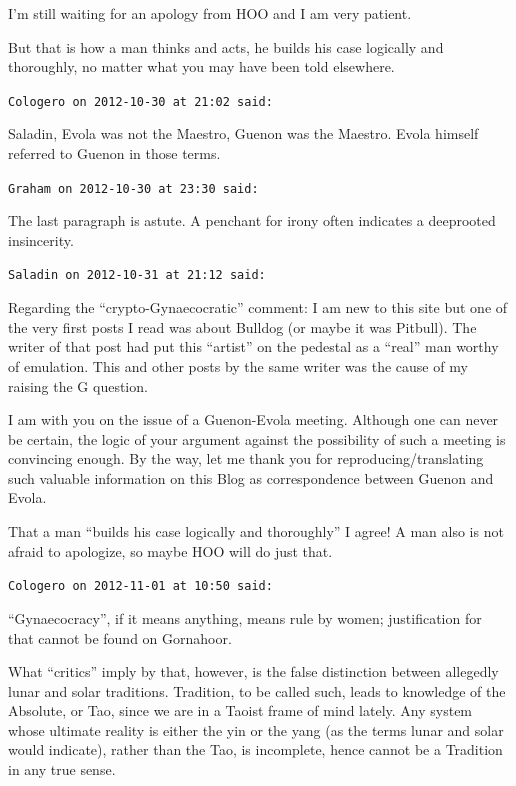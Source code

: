 \begin{footnotesize}
\begin{sffamily}
I'm still waiting for an apology from HOO and I am very patient.

But that is how a man thinks and acts, he builds his case logically and thoroughly, no matter what you may have been told elsewhere.

\hfill

\texttt{Cologero on 2012-10-30 at 21:02 said:}

Saladin, Evola was not the Maestro, Guenon was the Maestro. Evola himself referred to Guenon in those terms.

\hfill

\texttt{Graham on 2012-10-30 at 23:30 said:}

The last paragraph is astute. A penchant for irony often indicates a deeprooted insincerity.

\hfill

\texttt{Saladin on 2012-10-31 at 21:12 said:}

Regarding the ``crypto-Gynaecocratic'' comment: I am new to this site but one of the very first posts I read was about Bulldog (or maybe it was Pitbull). The writer of that post had put this ``artist'' on the pedestal as a ``real'' man worthy of emulation. This and other posts by the same writer was the cause of my raising the G question.

I am with you on the issue of a Guenon-Evola meeting. Although one can never be certain, the logic of your argument against the possibility of such a meeting is convincing enough. By the way, let me thank you for reproducing/translating such valuable information on this Blog as correspondence between Guenon and Evola.

That a man ``builds his case logically and thoroughly'' I agree! A man also is not afraid to apologize, so maybe HOO will do just that.

\hfill

\texttt{Cologero on 2012-11-01 at 10:50 said:}

``Gynaecocracy'', if it means anything, means rule by women; justification for that cannot be found on Gornahoor.

What ``critics'' imply by that, however, is the false distinction between allegedly lunar and solar traditions. Tradition, to be called such, leads to knowledge of the Absolute, or Tao, since we are in a Taoist frame of mind lately. Any system whose ultimate reality is either the yin or the yang (as the terms lunar and solar would indicate), rather than the Tao, is incomplete, hence cannot be a Tradition in any true sense.


\end{sffamily}
\end{footnotesize}
